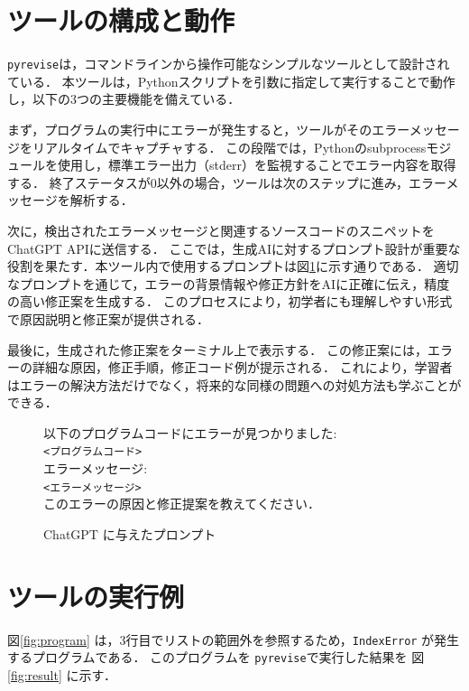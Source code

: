 \documentclass[12pt,twoside]{jbook}
\newcommand{\pyrevise}{\texttt{pyrevise}}
\begin{document}
\section{ツールの構成と動作}
\pyrevise は，コマンドラインから操作可能なシンプルなツールとして設計されている．
本ツールは，Pythonスクリプトを引数に指定して実行することで動作し，以下の3つの主要機能を備えている．

まず，プログラムの実行中にエラーが発生すると，ツールがそのエラーメッセージをリアルタイムでキャプチャする．
この段階では，Pythonのsubprocessモジュールを使用し，標準エラー出力（stderr）を監視することでエラー内容を取得する．
終了ステータスが0以外の場合，ツールは次のステップに進み，エラーメッセージを解析する．

次に，検出されたエラーメッセージと関連するソースコードのスニペットをChatGPT APIに送信する．
ここでは，生成AIに対するプロンプト設計が重要な役割を果たす．本ツール内で使用するプロンプトは図\ref{fig:prompt}に示す通りである．
適切なプロンプトを通じて，エラーの背景情報や修正方針をAIに正確に伝え，精度の高い修正案を生成する．
このプロセスにより，初学者にも理解しやすい形式で原因説明と修正案が提供される．

最後に，生成された修正案をターミナル上で表示する．
この修正案には，エラーの詳細な原因，修正手順，修正コード例が提示される．
これにより，学習者はエラーの解決方法だけでなく，将来的な同様の問題への対処方法も学ぶことができる．

\begin{figure}
  \centering
  {\footnotesize
  \begin{boxedminipage}{1.02\columnwidth}
以下のプログラムコードにエラーが見つかりました:\\
\verb!<プログラムコード>!\\
エラーメッセージ:\\
\verb!<エラーメッセージ>!\\
このエラーの原因と修正提案を教えてください．
  \end{boxedminipage}}
  \caption{ChatGPT に与えたプロンプト}\label{fig:prompt}
  \vspace{0.2cm}
\end{figure}

\section{ツールの実行例}
図\ref{fig:program} は，3行目でリストの範囲外を参照するため，\texttt{IndexError} が発生するプログラムである．
このプログラムを \pyrevise で実行した結果を 図\ref{fig:result} に示す．
\end{document}

